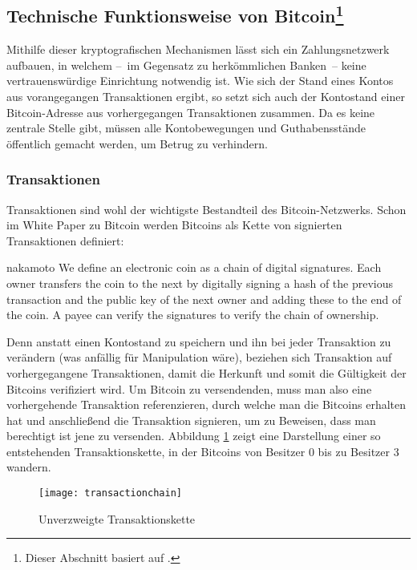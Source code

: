 \subsection[Technische Funktionsweise von Bitcoin]{Technische Funktionsweise von Bitcoin\footnote{Dieser Abschnitt basiert auf \cite{nielsen}.}}
\label{sec:mechanics}

Mithilfe dieser kryptografischen Mechanismen lässt sich ein Zahlungsnetzwerk aufbauen, in welchem --~im Gegensatz zu herkömmlichen Banken~-- keine vertrauenswürdige Einrichtung notwendig ist.
Wie sich der Stand eines Kontos aus vorangegangen Transaktionen ergibt, so setzt sich auch der Kontostand einer Bitcoin-Adresse aus vorhergegangen Transaktionen zusammen.
Da es keine zentrale Stelle gibt, müssen alle Kontobewegungen und Guthabensstände öffentlich gemacht werden, um Betrug zu verhindern.

\subsubsection{Transaktionen}

Transaktionen sind wohl der wichtigste Bestandteil des Bitcoin-Netzwerks.
Schon im White Paper zu Bitcoin werden Bitcoins als Kette von signierten Transaktionen definiert:

\begin{longquote}[2]{nakamoto}
We define an electronic coin as a chain of digital signatures. Each owner transfers the coin to the next by digitally signing a hash of the previous transaction and the public key of the next owner and adding these to the end of the coin. A payee can verify the signatures to verify the chain of ownership.
\end{longquote}

Denn anstatt einen Kontostand zu speichern und ihn bei jeder Transaktion zu verändern (was anfällig für Manipulation wäre), beziehen sich Transaktion auf vorhergegangene Transaktionen, damit die Herkunft und somit die Gültigkeit der Bitcoins verifiziert wird.
Um Bitcoin zu versendenden, muss man also eine vorhergehende Transaktion referenzieren, durch welche man die Bitcoins erhalten hat und anschließend die Transaktion signieren, um zu Beweisen, dass man berechtigt ist jene zu versenden.
Abbildung \ref{fig:transactionchain} zeigt eine Darstellung einer so entstehenden Transaktionskette, in der Bitcoins von Besitzer 0 bis zu Besitzer 3 wandern.

\begin{figure}[t]
    \begin{center}
        \texttt{[image: transactionchain]}
        \caption{Unverzweigte Transaktionskette \parencite[2]{nakamoto}}
        \label{fig:transactionchain}
    \end{center}
\end{figure}

